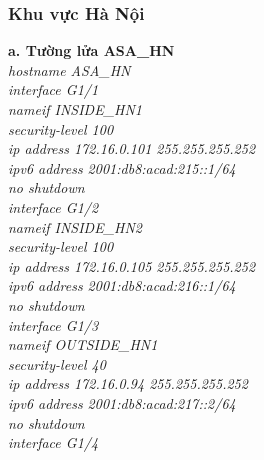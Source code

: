 \documentclass[12pt,a4paper]{report}
\begin{document}
\subsubsection{Khu vực Hà Nội}
\hspace*{1cm}\textbf{a. Tường lửa ASA\_HN}\\
\hspace*{2cm}\textit{hostname ASA\_HN\\
\hspace*{2cm}interface G1/1\\
\hspace*{2cm}nameif INSIDE\_HN1\\
\hspace*{2cm}security-level 100\\
\hspace*{2cm}ip address 172.16.0.101 255.255.255.252\\
\hspace*{2cm}ipv6 address 2001:db8:acad:215::1/64\\
\hspace*{2cm}no shutdown\\
\hspace*{2cm}interface G1/2\\
\hspace*{2cm}nameif INSIDE\_HN2\\
\hspace*{2cm}security-level 100\\
\hspace*{2cm}ip address 172.16.0.105 255.255.255.252\\
\hspace*{2cm}ipv6 address 2001:db8:acad:216::1/64\\
\hspace*{2cm}no shutdown\\
\hspace*{2cm}interface G1/3\\
\hspace*{2cm}nameif OUTSIDE\_HN1\\
\hspace*{2cm}security-level 40\\
\hspace*{2cm}ip address 172.16.0.94 255.255.255.252\\
\hspace*{2cm}ipv6 address 2001:db8:acad:217::2/64\\
\hspace*{2cm}no shutdown\\
\hspace*{2cm}interface G1/4\\
}
\end{document}
